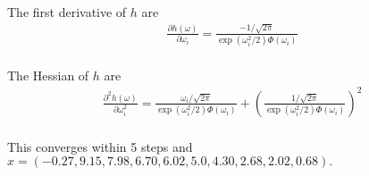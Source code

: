 \paragraph{}
The first derivative of $h$ are
\begin{align*}
\frac{\partial h(\omega)}{\partial \omega_i} = \frac{-1/\sqrt{2\pi}}{\exp(\omega^2_i/2)\Phi(\omega_i)} 
\end{align*}
\paragraph{}
The Hessian of $h$ are
\begin{align*}
\frac{\partial^2h(\omega)}{\partial \omega_i^2} = \frac{\omega_i/\sqrt{2\pi}}{\exp(\omega^2_i/2)\Phi(\omega_i)} +(\frac{1/\sqrt{2\pi}}{\exp(\omega^2_i/2)\Phi(\omega_i)})^2
\end{align*}
\paragraph{}
This converges within 5 steps and $x =(−0.27, 9.15, 7.98, 6.70, 6.02, 5.0, 4.30, 2.68, 2.02, 0.68).$

